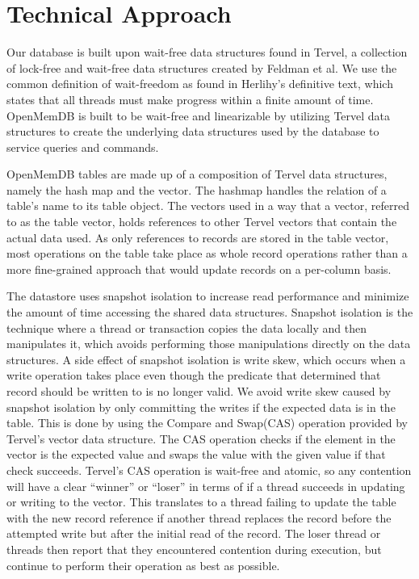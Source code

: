 \documentclass[conference, compsoc]{IEEEtran}
\begin{document}
\section{Technical Approach}
Our database is built upon wait-free data structures found in Tervel, a collection of
lock-free and wait-free data structures created by Feldman et al\cite{tervel:hazard_pointer}\cite{tervel:hash_map}\cite{tervel:vector}. 
We use the common definition of wait-freedom as found in Herlihy's definitive text, which
states that all threads must make progress within a finite amount of time\cite{herlihy:waitfree}. OpenMemDB is 
built to be wait-free and linearizable by utilizing Tervel data structures to create the 
underlying data structures used by the database to service queries and commands.

OpenMemDB tables are made up of a composition of Tervel data structures, namely the hash map and the
vector. The hashmap handles the relation of a table's name to its table object. The vectors used in a
way that a vector, referred to as the table vector, holds references to other Tervel vectors that contain
the actual data used. As only references to records are stored in the table vector, most operations on the
table take place as whole record operations rather than a more fine-grained approach that would update
records on a per-column basis.

The datastore uses snapshot isolation to increase read performance and minimize the amount of time accessing
the shared data structures. Snapshot isolation is the technique where a thread or transaction copies the data
locally and then manipulates it, which avoids performing those manipulations directly on the data structures.
A side effect of snapshot isolation is write skew, which occurs when a write operation takes place even though the
predicate that determined that record should be written to is no longer valid.
We avoid write skew caused by snapshot isolation by only committing the writes
if the expected data is in the table. This is done by using the Compare and Swap(CAS) operation provided
by Tervel's vector data structure. The CAS operation checks if the element in the vector is the
expected value and swaps the value with the given value if that check succeeds. Tervel's CAS
operation is wait-free and atomic, so any contention will have a clear ``winner'' or ``loser'' in terms
of if a thread succeeds in updating or writing to the vector. This translates to a thread failing to update the
table with the new record reference if another thread replaces the record before the attempted write but 
after the initial read of the record.  The loser thread or threads then report that they encountered 
contention during execution, but continue to perform their operation as best as possible.
\end{document}
